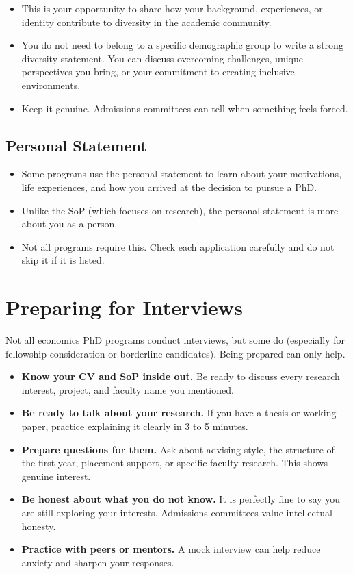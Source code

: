 \documentclass[11pt, letterpaper]{article}
\begin{document}
\begin{itemize}[leftmargin=*, itemsep=2pt]
    \item This is your opportunity to share how your background, experiences, or identity contribute to diversity in the academic community.
    \item You do not need to belong to a specific demographic group to write a strong diversity statement. You can discuss overcoming challenges, unique perspectives you bring, or your commitment to creating inclusive environments.
    \item Keep it genuine. Admissions committees can tell when something feels forced.
\end{itemize}

\subsection{Personal Statement}

\begin{itemize}[leftmargin=*, itemsep=2pt]
    \item Some programs use the personal statement to learn about your motivations, life experiences, and how you arrived at the decision to pursue a PhD.
    \item Unlike the SoP (which focuses on research), the personal statement is more about you as a person.
    \item Not all programs require this. Check each application carefully and do not skip it if it is listed.
\end{itemize}


\section{Preparing for Interviews}

Not all economics PhD programs conduct interviews, but some do (especially for fellowship consideration or borderline candidates). Being prepared can only help.

\begin{itemize}[leftmargin=*, itemsep=2pt]
    \item \textbf{Know your CV and SoP inside out.} Be ready to discuss every research interest, project, and faculty name you mentioned.
    \item \textbf{Be ready to talk about your research.} If you have a thesis or working paper, practice explaining it clearly in 3 to 5 minutes.
    \item \textbf{Prepare questions for them.} Ask about advising style, the structure of the first year, placement support, or specific faculty research. This shows genuine interest.
    \item \textbf{Be honest about what you do not know.} It is perfectly fine to say you are still exploring your interests. Admissions committees value intellectual honesty.
    \item \textbf{Practice with peers or mentors.} A mock interview can help reduce anxiety and sharpen your responses.
\end{itemize}
\end{document}
